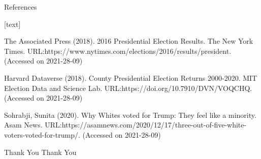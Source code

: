 \documentclass[11pt]{beamer}
\begin{document}
\begin{frame}{References}
\begin{thebibliography}{10}
[text]

The Associated Press (2018). 2016 Presidential Election Results. The New York Times. URL:https://www.nytimes.com/elections/2016/results/president. (Accessed on 2021-28-09)

Harvard Dataverse (2018). County Presidential Election Returns 2000-2020. MIT Election Data and Science Lab. URL:https://doi.org/10.7910/DVN/VOQCHQ. (Accessed on 2021-28-09)

Sohrabji, Sunita (2020). Why Whites voted for Trump: They feel like a minority. Asam News. URL:https://asamnews.com/2020/12/17/three-out-of-five-white-voters-voted-for-trump/. (Accessed on 2021-28-09)

\end{thebibliography}
\end{frame}

\begin{frame}{Thank You}
\centering
Thank You
\end{frame}
\end{document}
